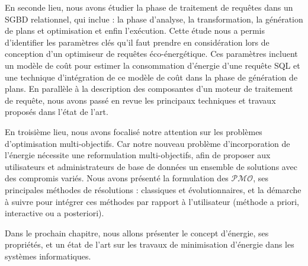 En seconde lieu, nous avons étudier la phase de traitement de requêtes dans un SGBD relationnel, qui inclue : la phase d'analyse, la transformation, la génération de plans et optimisation et enfin l'exécution. Cette étude nous a permis d'identifier les paramètres clés qu'il faut prendre en considération lors de conception d'un optimiseur de requêtes éco-énergétique. Ces paramètres incluent un modèle de coût pour estimer la consommation d'énergie d'une requête SQL et une technique d'intégration de ce modèle de coût dans la phase de génération de plans. En parallèle à la description des composantes d'un moteur de traitement de requête, nous avons passé en revue les principaux techniques et travaux proposés dans l'état de l'art.

En troisième lieu, nous avons focalisé notre attention sur les problèmes d'optimisation multi-objectifs. Car notre nouveau problème d'incorporation de l'énergie nécessite une reformulation multi-objectifs, afin de proposer aux utilisateurs et administrateurs de base de données un ensemble de solutions avec des compromis variés. Nous avons présenté la formulation des $\mathcal{PMO}$, ses principales méthodes de résolutions : classiques et évolutionnaires, et la démarche à suivre pour intégrer ces méthodes par rapport à l'utilisateur (méthode a priori, interactive ou a posteriori).

Dans le prochain chapitre, nous allons présenter le concept d'énergie, ses propriétés, et un état de l'art sur les travaux de minimisation d'énergie dans les systèmes informatiques.
